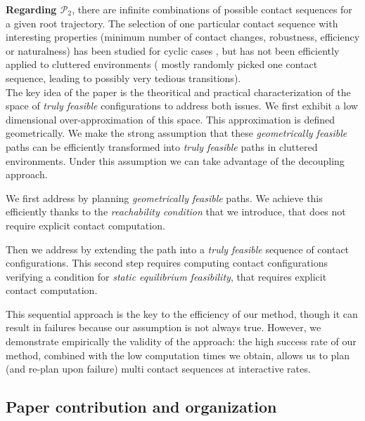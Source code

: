 \noindent \textbf{Regarding $\mathcal{P}_2$}, there are infinite combinations of possible contact sequences for a given root trajectory. The selection of one particular contact sequence with interesting properties (minimum number of contact changes, robustness, efficiency or naturalness) has been studied for cyclic cases \citep{Hauser06usingmotion}, but has not been efficiently applied to cluttered environments (\citeauthor{bouyarmane:lirmm-00777727, DBLP:conf/iser/EscandeKMG08} mostly randomly picked one contact sequence, leading to possibly very tedious transitions).  \\



The key idea of the paper is the theoritical and practical characterization of the space of \textit{truly feasible} configurations to address both issues.
We first exhibit a low dimensional over-approximation of this space. This approximation is defined geometrically. 
We make the strong assumption that these \textit{geometrically feasible} paths can be efficiently transformed into \textit{truly feasible} paths
in cluttered environments. 
Under this assumption we can take advantage of the decoupling approach.

We first address \Pa by planning \textit{geometrically feasible} paths. We achieve this efficiently thanks to the \textit{reachability condition} that we introduce, that 
does not require explicit contact computation.

Then we address \Pb by extending the path into a \textit{truly feasible} sequence of contact configurations.
This second step requires computing contact configurations verifying a condition for \textit{static equilibrium feasibility}, that requires
explicit contact computation.

This sequential approach is the key to the efficiency of our method, though it
can result in failures because our assumption is not always true. However, we demonstrate empirically the validity of the approach: the high success rate of our method, combined with the low computation times we obtain, allows us to plan (and re-plan upon failure) multi contact sequences at interactive rates.

\subsection{Paper contribution and organization}


